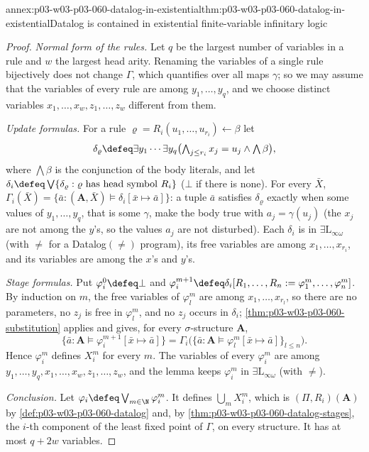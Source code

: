 \begin{annexitem}{annex:p03-w03-p03-060-datalog-in-existential}{thm:p03-w03-p03-060-datalog-in-existential}{Datalog is contained in existential finite-variable infinitary logic}
\begin{proof}
\emph{Normal form of the rules.} Let \(q\) be the largest number of
variables in a rule and \(w\) the largest head arity. Renaming the
variables of a single rule bijectively does not change \(\Gamma\), which
quantifies over all maps \(\gamma\); so we may assume that the variables of
every rule are among \(y_1,\ldots,y_q\), and we choose distinct variables
\(x_1,\ldots,x_w,z_1,\ldots,z_w\) different from them.

\emph{Update formulas.} For a rule \(\varrho=R_i(u_1,\ldots,u_{r_i})\leftarrow\beta\)
let
\[
 \delta_\varrho\defeq\exists y_1\cdots\exists y_q\bigl(\textstyle\bigwedge_{j\le r_i}x_j=u_j\wedge\bigwedge\beta\bigr),
\]
where \(\bigwedge\beta\) is the conjunction of the body literals, and let
\(\delta_i\defeq\bigvee\{\delta_\varrho:\varrho\text{ has head symbol }R_i\}\)
(\(\bot\) if there is none). For every \(\bar X\),
\(\Gamma_i(\bar X)=\{\bar a:(\mathbf A,\bar X)\models\delta_i[\bar x\mapsto\bar a]\}\):
a tuple \(\bar a\) satisfies \(\delta_\varrho\) exactly when some values of
\(y_1,\ldots,y_q\), that is some \(\gamma\), make the body true with
\(a_j=\gamma(u_j)\) (the \(x_j\) are not among the \(y\)'s, so the values
\(a_j\) are not disturbed). Each \(\delta_i\) is in
\(\exists\mathrm{L}_{\infty\omega}\) (with \(\neq\) for a
Datalog\((\neq)\) program), its free variables are among
\(x_1,\ldots,x_{r_i}\), and its variables are among the \(x\)'s and
\(y\)'s.

\emph{Stage formulas.} Put \(\varphi_i^0\defeq\bot\) and
\(\varphi_i^{m+1}\defeq\delta_i[R_1,\ldots,R_n:=\varphi_1^m,\ldots,\varphi_n^m]\).
By induction on \(m\), the free variables of \(\varphi_l^m\) are among
\(x_1,\ldots,x_{r_l}\), so there are no parameters, no \(z_j\) is free in
\(\varphi_l^m\), and no \(z_j\) occurs in \(\delta_i\);
\cref{thm:p03-w03-p03-060-substitution} applies and gives, for every
\(\sigma\)-structure \(\mathbf A\),
\[
 \{\bar a:\mathbf A\models\varphi_i^{m+1}[\bar x\mapsto\bar a]\}
 =\Gamma_i\bigl(\{\bar a:\mathbf A\models\varphi_l^m[\bar x\mapsto\bar a]\}_{l\le n}\bigr).
\]
Hence \(\varphi_i^m\) defines \(X^m_i\) for every \(m\). The variables of
every \(\varphi_i^m\) are among \(y_1,\ldots,y_q,x_1,\ldots,x_w,z_1,\ldots,z_w\),
and the lemma keeps \(\varphi_i^m\) in \(\exists\mathrm{L}_{\infty\omega}\)
(with \(\neq\)).

\emph{Conclusion.} Let \(\varphi_i\defeq\bigvee_{m\in\N}\varphi_i^m\). It
defines \(\bigcup_mX^m_i\), which is \((\Pi,R_i)(\mathbf A)\) by
\cref{def:p03-w03-p03-060-datalog} and, by
\cref{thm:p03-w03-p03-060-datalog-stages}, the \(i\)-th component of the
least fixed point of \(\Gamma\), on every structure. It has at most
\(q+2w\) variables.
\end{proof}
\end{annexitem}

